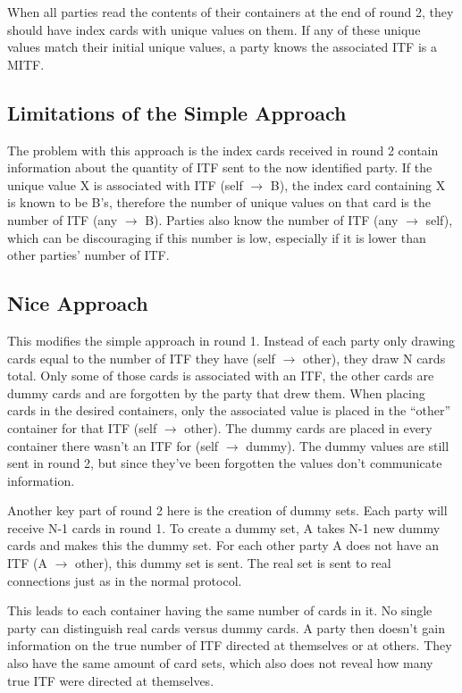 \documentclass[conference]{IEEEtran}
\begin{document}
When all parties read the contents of their containers at the end of round 2, they should have index cards with unique values on them. If any of these unique values match their initial unique values, a party knows the associated ITF is a MITF.

\subsection{Limitations of the Simple Approach}
The problem with this approach is the index cards received in round 2 contain information about the quantity of ITF sent to the now identified party. If the unique value X is associated with ITF (self $\rightarrow$ B), the index card containing X is known to be B’s, therefore the number of unique values on that card is the number of ITF (any $\rightarrow$ B). Parties also know the number of ITF (any $\rightarrow$ self), which can be discouraging if this number is low, especially if it is lower than other parties' number of ITF.

\subsection{Nice Approach}
This modifies the simple approach in round 1. Instead of each party only drawing cards equal to the number of ITF they have (self $\rightarrow$ other), they draw N cards total. Only some of those cards is associated with an ITF, the other cards are dummy cards and are forgotten by the party that drew them. When placing cards in the desired containers, only the associated value is placed in the “other” container for that ITF (self $\rightarrow$ other). The dummy cards are placed in every container there wasn't an ITF for (self $\rightarrow$ dummy). The dummy values are still sent in round 2, but since they've been forgotten the values don't communicate information.

Another key part of round 2 here is the creation of dummy sets. Each party will receive N-1 cards in round 1. To create a dummy set, A takes N-1 new dummy cards and makes this the dummy set. For each other party A does not have an ITF (A $\rightarrow$ other), this dummy set is sent. The real set is sent to real connections just as in the normal protocol.

This leads to each container having the same number of cards in it. No single party can distinguish real cards versus dummy cards. A party then doesn’t gain information on the true number of ITF directed at themselves or at others. They also have the same amount of card sets, which also does not reveal how many true ITF were directed at themselves.
\end{document}
